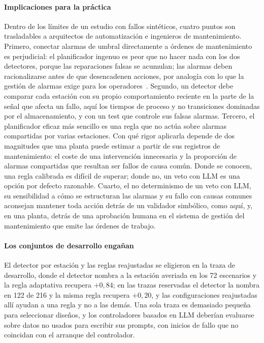 \documentclass[preprint,11pt]{elsarticle}
\begin{document}
\paragraph{Implicaciones para la práctica}
Dentro de los límites de un estudio con fallos sintéticos, cuatro puntos son trasladables a arquitectos de automatización e ingenieros de mantenimiento. Primero, conectar alarmas de umbral directamente a órdenes de mantenimiento es perjudicial: el planificador ingenuo es peor que no hacer nada con los dos detectores, porque las reparaciones falsas se acumulan; las alarmas deben racionalizarse antes de que desencadenen acciones, por analogía con lo que la gestión de alarmas exige para los operadores~\cite{isa182,isatr1826}. Segundo, un detector debe comparar cada estación con su propio comportamiento reciente en la parte de la señal que afecta un fallo, aquí los tiempos de proceso y no transiciones dominadas por el almacenamiento, y con un test que controle sus falsas alarmas. Tercero, el planificador eficaz más sencillo es una regla que no actúa sobre alarmas compartidas por varias estaciones. Con qué rigor aplicarla depende de dos magnitudes que una planta puede estimar a partir de sus registros de mantenimiento: el coste de una intervención innecesaria y la proporción de alarmas compartidas que resultan ser fallos de causa común. Donde se conocen, una regla calibrada es difícil de superar; donde no, un veto con LLM es una opción por defecto razonable. Cuarto, el no determinismo de un veto con LLM, su sensibilidad a cómo se estructuran las alarmas y su fallo con causas comunes aconsejan mantener toda acción detrás de un validador simbólico, como aquí, y, en una planta, detrás de una aprobación humana en el sistema de gestión del mantenimiento que emite las órdenes de trabajo.

\paragraph{Los conjuntos de desarrollo engañan}
El detector por estación y las reglas reajustadas se eligieron en la traza de desarrollo, donde el detector nombra a la estación averiada en los 72 escenarios y la regla adaptativa recupera $+0{,}84$; en las trazas reservadas el detector la nombra en 122 de 216 y la misma regla recupera $+0{,}20$, y las configuraciones reajustadas allí ayudan a una regla y no a las demás. Una sola traza es demasiado pequeña para seleccionar diseños, y los controladores basados en LLM deberían evaluarse sobre datos no usados para escribir sus prompts, con inicios de fallo que no coincidan con el arranque del controlador.
\end{document}
